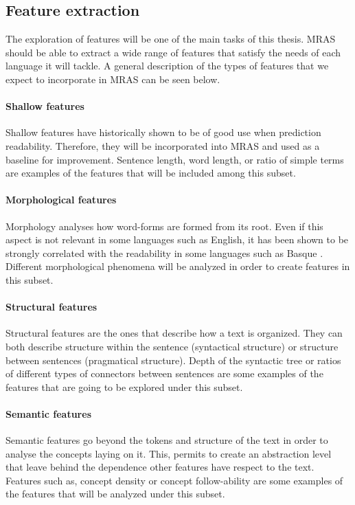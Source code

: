 \documentclass[12pt]{article}
\begin{document}
\subsection{Feature extraction}
The exploration of features will be one of the main tasks of this thesis. MRAS should be able to extract a wide range of features that satisfy the needs of each language it will tackle. A general description of the types of features that we expect to incorporate in MRAS can be seen below.



\paragraph{Shallow features}
Shallow features \cite{flesch1948new,chall1995readability,albright1996readability} have historically shown to be of good use when prediction readability. Therefore, they will be incorporated into MRAS and used as a baseline for improvement. Sentence length, word length, or ratio of simple terms are examples of the features that will be included among this subset.



\paragraph{Morphological features}
Morphology analyses how word-forms are formed from its root. Even if this  aspect is not relevant in some languages such as English, it has been shown to be strongly correlated with the readability in some languages such as Basque \cite{gonzalez2014simple}. Different morphological phenomena will be analyzed in order to create features in this subset.

\paragraph{Structural features}
Structural features are the ones that describe how a text is organized. They can both describe structure within the sentence (syntactical structure) or structure between sentences (pragmatical structure). Depth of the syntactic tree or ratios of different types of connectors between sentences are some examples of the features that are going to be explored under this subset.

\paragraph{Semantic features}
Semantic features go beyond the tokens and structure of the text in order to analyse the concepts laying on it. This, permits to create an abstraction level that leave behind the dependence other features have respect to the text. Features such as, concept density or concept follow-ability are some examples of the features that will be analyzed under this subset.
\end{document}
